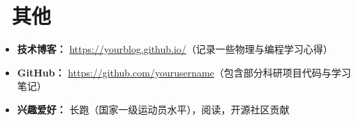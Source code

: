 \documentclass[11pt]{article}
\begin{document}
\section{\makebox[\widthof{\faInfo}][c]{\color{CVBlue}\faInfo}\ 其他}
\begin{itemize}[parsep=0.5ex]
    \item \textbf{技术博客：} \href{https://yourblog.github.io/}{https://yourblog.github.io/}（记录一些物理与编程学习心得）
    \item \textbf{GitHub：} \href{https://github.com/yourusername}{https://github.com/yourusername}（包含部分科研项目代码与学习笔记）
    \item \textbf{兴趣爱好：} 长跑（国家一级运动员水平），阅读，开源社区贡献
\end{itemize}
\end{document}
